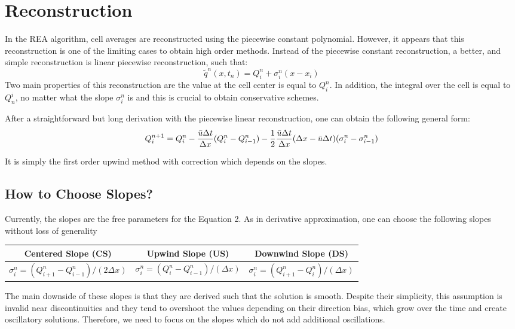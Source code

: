 \documentclass[journal,onecolumn]{IEEEtran}
\begin{document}
\section{Reconstruction}
In the REA algorithm, cell averages are reconstructed using the piecewise constant polynomial. However, it appears that this reconstruction is one of the limiting cases to obtain high order methods. Instead of the piecewise constant reconstruction, a better, and simple reconstruction is linear piecewise reconstruction, such that:
$$
    \tilde{q}^n(x, t_n) = Q^n_i + \sigma_i^n(x - x_i)
$$
Two main properties of this reconstruction are the value at the cell center is equal to $Q_i^n$. In addition, the integral over the cell is equal to $Q_n^i$, no matter what the slope $\sigma_i^n$ is and this is crucial to obtain conservative schemes.
\par
After a straightforward but long derivation with the piecewise linear reconstruction, one can obtain the following general form:
\begin{equation}
        Q_i^{n+1} = Q_i^{n} - \frac{\Bar{u}\Delta t}{\Delta x}({Q}^n_{i} - {Q}^n_{i-1}) - \frac{1}{2}\frac{\Bar{u}\Delta t}{\Delta x}(\Delta x - \Bar{u}\Delta t)(\sigma_i^n - \sigma^n_{i-1})
\end{equation}

It is simply the first order upwind method with correction which depends on the slopes.

\subsection{How to Choose Slopes?}
Currently, the slopes are the free parameters for the Equation 2. As in derivative approximation, 
one can choose the following slopes without loss of generality
\newline
\begin{center}
\begin{tabular}{c|c|c}
     Centered Slope (CS) & Upwind Slope (US) & Downwind Slope (DS) \\
     \hline 
     $\sigma_i^n = (Q^n_{i+1} - Q^n_{i-1})/(2\Delta x)$ & $\sigma_i^n = (Q^n_{i} - Q^n_{i-1})/(\Delta x)$ & $\sigma_i^n = (Q^n_{i+1} - Q^n_{i})/(\Delta x)$
\end{tabular}
\end{center}
\newline

The main downside of these slopes is that they are derived such that the solution is smooth. Despite their simplicity, this assumption is invalid near discontinuities and they tend to overshoot the values depending on their direction bias, which grow over the time and create oscillatory solutions. Therefore, we need to focus on the slopes which do not add additional oscillations.
\end{document}
